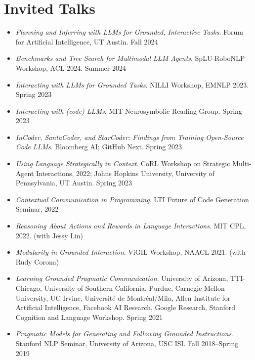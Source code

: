 


\section{Invited Talks}
\begin{itemize}[leftmargin=-0.4mm,partopsep=0pt,label=]
\item \emph{Planning and Inferring with LLMs for Grounded, Interactive Tasks}. Forum for Artificial Intelligence, UT Austin. Fall 2024
\item \emph{Benchmarks and Tree Search for Multimodal LLM Agents}. SpLU-RoboNLP Workshop, ACL 2024. Summer 2024
\item \emph{Interacting with LLMs for Grounded Tasks}. NILLI Workshop, EMNLP 2023. Spring 2023
\item \emph{Interacting with (code) LLMs}. MIT Neurosymbolic Reading Group. Spring 2023
\item \emph{InCoder, SantaCoder, and StarCoder: Findings from Training Open-Source Code LLMs}. Bloomberg AI; GitHub Next. Spring 2023
\item \emph{Using Language Strategically in Context}. CoRL Workshop on Strategic Multi-Agent Interactions, 2022; Johns Hopkins University, University of Pennsylvania, UT Austin. Spring 2023
\item \emph{Contextual Communication in Programming}. LTI Future of Code Generation Seminar, 2022
\item \emph{Reasoning About Actions and Rewards in Language Interactions}. MIT CPL, 2022. (with Jessy Lin)
\item \emph{Modularity in Grounded Interaction}. ViGIL Workshop, NAACL 2021. (with Rudy Corona)
\item \emph{Learning Grounded Pragmatic Communication}. University of Arizona, TTI-Chicago, University of Southern California, Purdue, Carnegie Mellon University, UC Irvine, Université de Montréal/Mila, Allen Institute for Artificial Intelligence, Facebook AI Research, Google Research, Stanford Cognition and Language Workshop. Spring 2021
\item \emph{Pragmatic Models for Generating and Following Grounded Instructions}. Stanford NLP Seminar, University of Arizona, USC ISI. Fall 2018--Spring 2019
\end{itemize}
